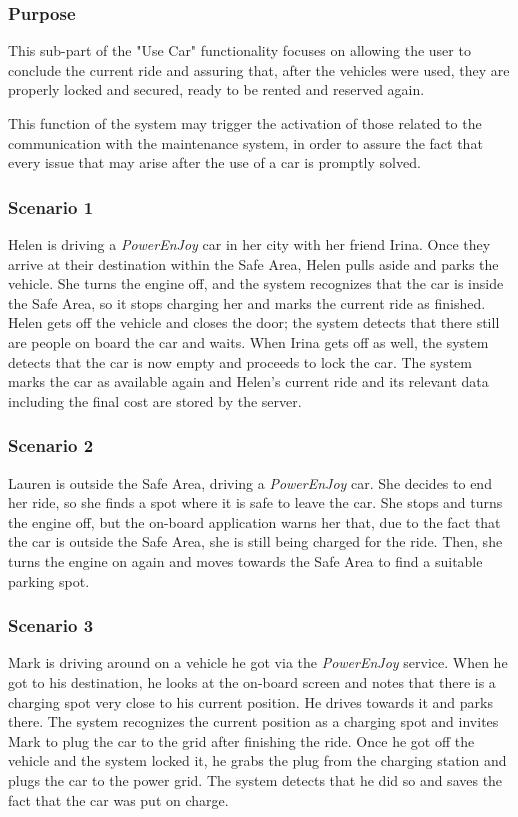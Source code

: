 \subsubsection{Purpose}
This sub-part of the "Use Car" functionality focuses on allowing the user to conclude the current ride and assuring that, after the vehicles were used, they are properly locked and secured, ready to be rented and reserved again.

This function of the system may trigger the activation of those related to the communication with the maintenance system, in order to assure the fact that every issue that may arise after the use of a car is promptly solved.

\subsubsection{Scenario 1}
Helen is driving a \emph{PowerEnJoy} car in her city with her friend Irina. Once they arrive at their destination within the Safe Area, Helen pulls aside and parks the vehicle. She turns the engine off, and the system recognizes that the car is inside the Safe Area, so it stops charging her and marks the current ride as finished. Helen gets off the vehicle and closes the door; the system detects that there still are people on board the car and waits. When Irina gets off as well, the system detects that the car is now empty and proceeds to lock the car. The system marks the car as available again and Helen's current ride and its relevant data including the final cost are stored by the server.

\subsubsection{Scenario 2}
Lauren is outside the Safe Area, driving a \emph{PowerEnJoy} car. She decides to end her ride, so she finds a spot where it is safe to leave the car. She stops and turns the engine off, but the on-board application warns her that, due to the fact that the car is outside the Safe Area, she is still being charged for the ride. Then, she turns the engine on again and moves towards the Safe Area to find a suitable parking spot.

\subsubsection{Scenario 3}
Mark is driving around on a vehicle he got via the \emph{PowerEnJoy} service. When he got to his destination, he looks at the on-board screen and notes that there is a charging spot very close to his current position. He drives towards it and parks there. The system recognizes the current position as a charging spot and invites Mark to plug the car to the grid after finishing the ride. Once he got off the vehicle and the system locked it, he grabs the plug from the charging station and plugs the car to the power grid. The system detects that he did so and saves the fact that the car was put on charge.

